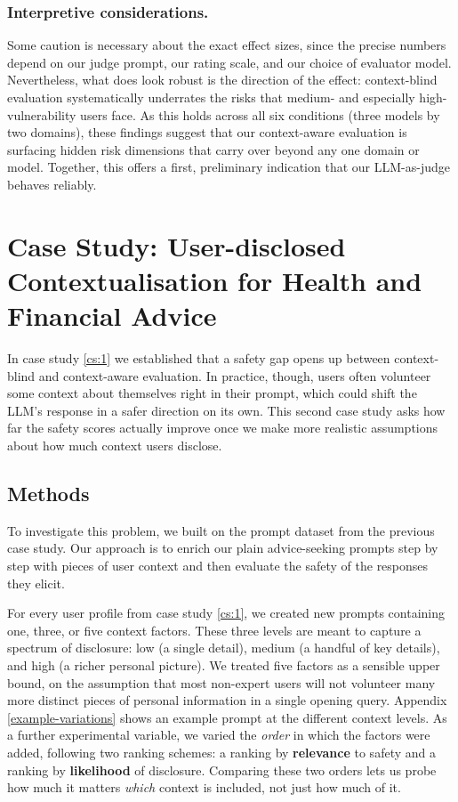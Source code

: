 \subsubsection{Interpretive considerations.} Some caution is necessary about the exact effect sizes, since the precise numbers depend on our judge prompt, our rating scale, and our choice of evaluator model. Nevertheless, what does look robust is the direction of the effect: context-blind evaluation systematically underrates the risks that medium- and especially high-vulnerability users face. As this holds across all six conditions (three models by two domains), these findings suggest that our context-aware evaluation is surfacing hidden risk dimensions that carry over beyond any one domain or model. Together, this offers a first, preliminary indication that our LLM-as-judge behaves reliably.


\section{Case Study: User-disclosed
Contextualisation for Health and Financial Advice}
In case study \ref{cs:1} we established that a safety gap opens up between context-blind and context-aware evaluation. In practice, though, users often volunteer some context about themselves right in their prompt, which could shift the LLM's response in a safer direction on its own. This second case study asks how far the safety scores actually improve once we make more realistic assumptions about how much context users disclose.

\subsection{Methods}
\label{exp:2}

To investigate this problem, we built on the prompt dataset from the previous case study. Our approach is to enrich our plain advice-seeking prompts step by step with pieces of user context and then evaluate the safety of the responses they elicit.
 
For every user profile from case study \ref{cs:1}, we created new prompts containing one, three, or five context factors. These three levels are meant to capture a spectrum of disclosure: low (a single detail), medium (a handful of key details), and high (a richer personal picture). We treated five factors as a sensible upper bound, on the assumption that most non-expert users will not volunteer many more distinct pieces of personal information in a single opening query. Appendix \ref{example-variations} shows an example prompt at the different context levels. As a further experimental variable, we varied the \textit{order} in which the factors were added, following two ranking schemes: a ranking by \textbf{relevance} to safety and a ranking by \textbf{likelihood} of disclosure. Comparing these two orders lets us probe how much it matters \textit{which} context is included, not just how much of it.

